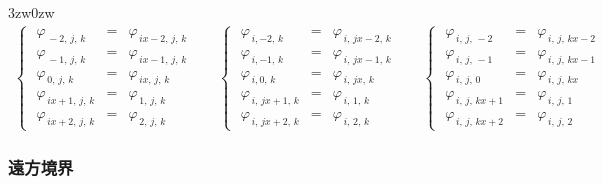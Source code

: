 \begin{indentation}{3zw}{0zw}
\begin{equation}
\begin{array}{ccc}
\left\{ \,\, \begin{array}{lll}
\varphi_{\,-2,\,j,\,k}   &=& \varphi_{\,ix-2,\,j,\,k}\\
\varphi_{\,-1,\,j,\,k}   &=& \varphi_{\,ix-1,\,j,\,k}\\
\varphi_{\,0,\,j,\,k}    &=& \varphi_{\,ix,\,j,\,k}\\
\varphi_{\,ix+1,\,j,\,k} &=& \varphi_{\,1,\,j,\,k}\\
\varphi_{\,ix+2,\,j,\,k} &=& \varphi_{\,2,\,j,\,k}
\end{array} \right. \quad
&
\left\{ \,\, \begin{array}{lll}
\varphi_{\,i,-2,\,k}     &=& \varphi_{\,i,\,jx-2,\,k}\\
\varphi_{\,i,-1,\,k}     &=& \varphi_{\,i,\,jx-1,\,k}\\
\varphi_{\,i,0,\,k}      &=& \varphi_{\,i,\,jx,\,k}\\
\varphi_{\,i,\,jx+1,\,k} &=& \varphi_{\,i,\,1,\,k}\\
\varphi_{\,i,\,jx+2,\,k} &=& \varphi_{\,i,\,2,\,k}
\end{array} \right. \quad
&
\left\{ \,\, \begin{array}{lll}
\varphi_{\,i,\,j,\,-2}   &=& \varphi_{\,i,\,j,\,kx-2}\\
\varphi_{\,i,\,j,\,-1}   &=& \varphi_{\,i,\,j,\,kx-1}\\
\varphi_{\,i,\,j,\,0}    &=& \varphi_{\,i,\,j,\,kx}\\
\varphi_{\,i,\,j,\,kx+1} &=& \varphi_{\,i,\,j,\,1}\\
\varphi_{\,i,\,j,\,kx+2} &=& \varphi_{\,i,\,j,\,2}
\end{array} \right.
\end{array}
\label{eq:periodic BC}
\end{equation}


\end{indentation}


\pagebreak
%
\subsubsection{遠方境界}
\label{sec:BC trc_free}

